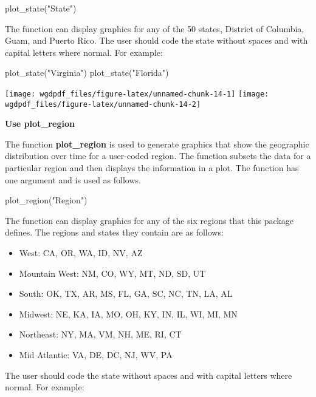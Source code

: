 \begin{Schunk}
\begin{Sinput}
plot_state("State")
\end{Sinput}
\end{Schunk}

The function can display graphics for any of the 50 states, District of
Columbia, Guam, and Puerto Rico. The user should code the state without
spaces and with capital letters where normal. For example:

\begin{Schunk}
\begin{Sinput}
plot_state("Virginia")
plot_state("Florida")
\end{Sinput}

\texttt{[image: wgdpdf\_files/figure-latex/unnamed-chunk-14-1]} \texttt{[image: wgdpdf\_files/figure-latex/unnamed-chunk-14-2]} \end{Schunk}

\textbf{Use plot\_region}

The function \textbf{plot\_region} is used to generate graphics that
show the geographic distribution over time for a user-coded region. The
function subsets the data for a particular region and then displays the
information in a plot. The function has one argument and is used as
follows.

\begin{Schunk}
\begin{Sinput}
plot_region("Region")
\end{Sinput}
\end{Schunk}

The function can display graphics for any of the six regions that this
package defines. The regions and states they contain are as follows:

\begin{itemize}
\tightlist
\item
  West: CA, OR, WA, ID, NV, AZ
\item
  Mountain West: NM, CO, WY, MT, ND, SD, UT
\item
  South: OK, TX, AR, MS, FL, GA, SC, NC, TN, LA, AL
\item
  Midwest: NE, KA, IA, MO, OH, KY, IN, IL, WI, MI, MN
\item
  Northeast: NY, MA, VM, NH, ME, RI, CT
\item
  Mid Atlantic: VA, DE, DC, NJ, WV, PA
\end{itemize}

The user should code the state without spaces and with capital letters
where normal. For example:


